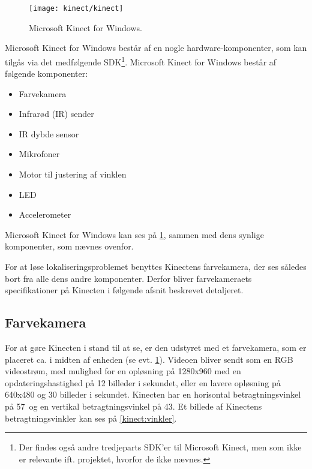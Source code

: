 %

\begin{figure}
\centering
\texttt{[image: kinect/kinect]}
\caption{Microsoft Kinect for Windows.}
\label{kinect:opbygning}
\end{figure}

Microsoft Kinect for Windows består af en nogle hardware-komponenter, som kan tilgås via det medfølgende SDK\footnote{Der findes også andre tredjeparts SDK'er til Microsoft Kinect, men som ikke er relevante ift. projektet, hvorfor de ikke nævnes.}.
Microsoft Kinect for Windows består af følgende komponenter:

\begin{itemize}
\item Farvekamera
\item Infrarød (IR) sender
\item IR dybde sensor
\item Mikrofoner
\item Motor til justering af vinklen
\item LED
\item Accelerometer
\end{itemize}

Microsoft Kinect for Windows kan ses på \cref{kinect:opbygning}, sammen med dens synlige komponenter, som nævnes ovenfor.

For at løse lokaliseringsproblemet benyttes Kinectens farvekamera, der ses således bort fra alle dens andre komponenter.
Derfor bliver farvekameraets specifikationer på Kinecten i følgende afsnit beskrevet detaljeret.

\subsection{Farvekamera}\label{kinect:farvekamera}
For at gøre Kinecten i stand til at se, er den udstyret med et farvekamera, som er placeret ca. i midten af enheden (se evt. \cref{kinect:opbygning}).
Videoen bliver sendt som en RGB videostrøm, med mulighed for en opløsning på 1280x960 med en opdateringshastighed på 12 billeder i sekundet, eller en lavere opløsning på 640x480 og 30 billeder i sekundet.\cite{kinectForWindowsFeatures}
Kinecten har en horisontal betragtningsvinkel på 57\degree~og en vertikal betragtningsvinkel på 43\degree.
Et billede af Kinectens betragtningsvinkler kan ses på \cref{kinect:vinkler}.

